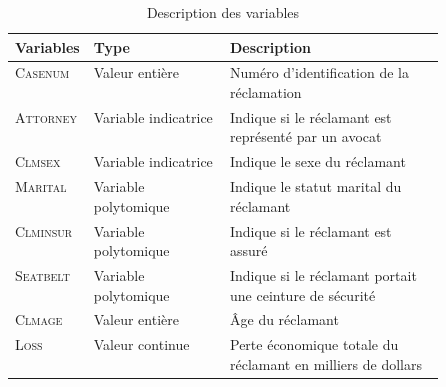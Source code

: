 \documentclass{article}\usepackage[]{graphicx}\usepackage[]{color}
\begin{document}
\begin{table}[htbp]
\centering
\caption{Description des variables}
\begin{tabular}{|llp{0.5\linewidth}|}
\hline
\textbf{Variables} & \textbf{Type}        & \textbf{Description}                                         \\ \hline
\textsc{Casenum}            & Valeur entière       & Numéro d'identification de la réclamation                    \\ \hline
\textsc{Attorney}           & Variable indicatrice & Indique si le réclamant est représenté par un avocat         \\ \hline
\textsc{Clmsex}             & Variable indicatrice & Indique le sexe du réclamant                                 \\ \hline
\textsc{Marital}             & Variable polytomique & Indique le statut marital du réclamant                       \\ \hline
\textsc{Clminsur}            & Variable polytomique & Indique si le réclamant est assuré                           \\ \hline
\textsc{Seatbelt}            & Variable polytomique & Indique si le réclamant portait une ceinture de sécurité     \\ \hline
\textsc{Clmage}              & Valeur entière       & Âge du réclamant                                             \\ \hline
\textsc{Loss}                & Valeur continue      & Perte économique totale du réclamant  en milliers de dollars \\ \hline
\end{tabular}
\end{table}
\end{document}
